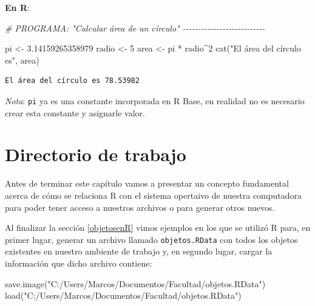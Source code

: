\documentclass[
]{book}
\newenvironment{Shaded}{\begin{snugshade}}{\end{snugshade}}
\newcommand{\CommentTok}[1]{\textcolor[rgb]{0.56,0.35,0.01}{\textit{#1}}}
\newcommand{\DecValTok}[1]{\textcolor[rgb]{0.00,0.00,0.81}{#1}}
\newcommand{\FloatTok}[1]{\textcolor[rgb]{0.00,0.00,0.81}{#1}}
\newcommand{\FunctionTok}[1]{\textcolor[rgb]{0.00,0.00,0.00}{#1}}
\newcommand{\NormalTok}[1]{#1}
\newcommand{\OtherTok}[1]{\textcolor[rgb]{0.56,0.35,0.01}{#1}}
\newcommand{\SpecialCharTok}[1]{\textcolor[rgb]{0.00,0.00,0.00}{#1}}
\newcommand{\StringTok}[1]{\textcolor[rgb]{0.31,0.60,0.02}{#1}}
\begin{document}
\textbf{En R}:

\begin{Shaded}
\begin{Highlighting}[]
\CommentTok{\# PROGRAMA: "Calcular área de un círculo" {-}{-}{-}{-}{-}{-}{-}{-}{-}{-}{-}{-}{-}{-}{-}{-}{-}{-}{-}{-}{-}{-}{-}{-}{-}{-}{-}}

\NormalTok{pi }\OtherTok{\textless{}{-}}  \FloatTok{3.14159265358979}
\NormalTok{radio }\OtherTok{\textless{}{-}} \DecValTok{5}
\NormalTok{area }\OtherTok{\textless{}{-}}\NormalTok{ pi }\SpecialCharTok{*}\NormalTok{ radio}\SpecialCharTok{\^{}}\DecValTok{2}
\FunctionTok{cat}\NormalTok{(}\StringTok{"El área del círculo es"}\NormalTok{, area)}
\end{Highlighting}
\end{Shaded}

\begin{verbatim}
El área del círculo es 78.53982
\end{verbatim}

\emph{Nota}: \texttt{pi} ya es una constante incorporada en R Base, en realidad no es necesario crear esta constante y asignarle valor.

\hypertarget{directorio-de-trabajo}{%
\section{Directorio de trabajo}\label{directorio-de-trabajo}}

Antes de terminar este capítulo vamos a presentar un concepto fundamental acerca de cómo se relaciona R con el sistema opertaivo de nuestra computadora para poder tener acceso a nuestros archivos o para generar otros nuevos.

Al finalizar la sección \ref{objetosenR} vimos ejemplos en los que se utilizó R para, en primer lugar, generar un archivo llamado \texttt{objetos.RData} con todos los objetos existentes en nuestro ambiente de trabajo y, en segundo lugar, cargar la información que dicho archivo contiene:

\begin{Shaded}
\begin{Highlighting}[]
\FunctionTok{save.image}\NormalTok{(}\StringTok{"C:/Users/Marcos/Documentos/Facultad/objetos.RData"}\NormalTok{)}
\FunctionTok{load}\NormalTok{(}\StringTok{"C:/Users/Marcos/Documentos/Facultad/objetos.RData"}\NormalTok{)}
\end{Highlighting}
\end{Shaded}
\end{document}
